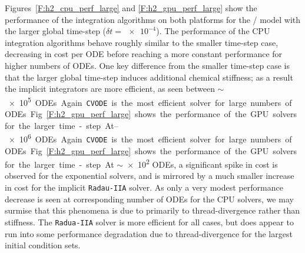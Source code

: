 \documentclass[final,twocolumn]{elsarticle}
\begin{document}
Figures~\ref{F:h2_cpu_perf_large} and \ref{F:h2_gpu_perf_large} show the performance of the integration algorithms on both platforms for the \slash{} model with the larger global time-step ($\delta t=\num{e-4}$).
The performance of the CPU integration algorithms behave roughly similar to the smaller time-step case, decreasing in cost per ODE before reaching a more constant performance for higher numbers of ODEs.
One key difference from the smaller time-step case is that the larger global time-step induces additional chemical stiffness; as a result the implicit integrators are more efficient, as seen between $\sim$\SIrange{e5}{e6} ODEs.
Again \texttt{CVODE} is the most efficient solver for large numbers of ODEs.
Fig.~\ref{F:h2_gpu_perf_large} shows the performance of the GPU solvers for the larger time-step.
At $\sim$\num{e2} ODEs, a significant spike in cost is observed for the exponential solvers, and is mirrored by a much smaller increase in cost for the implicit \texttt{Radau-IIA} solver.
As only a very modest performance decrease is seen at corresponding number of ODEs for the CPU solvers, we may surmise that this phenomena is due to primarily to thread-divergence rather than stiffness.
The \texttt{Radua-IIA} solver is more efficient for all cases, but does appear to run into some performance degradation due to thread-divergence for the largest initial condition sets.
\end{document}
